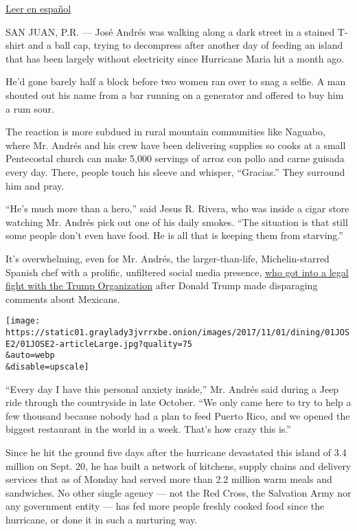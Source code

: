 \href{https://www.nytimes3xbfgragh.onion/es/2017/11/03/los-chefs-que-cambian-como-se-entrega-la-ayuda-posdesastre/}{Leer
en español}

SAN JUAN, P.R. --- José Andrés was walking along a dark street in a
stained T-shirt and a ball cap, trying to decompress after another day
of feeding an island that has been largely without electricity since
Hurricane Maria hit a month ago.

He'd gone barely half a block before two women ran over to snag a
selfie. A man shouted out his name from a bar running on a generator and
offered to buy him a rum sour.

The reaction is more subdued in rural mountain communities like Naguabo,
where Mr. Andrés and his crew have been delivering supplies so cooks at
a small Pentecostal church can make 5,000 servings of arroz con pollo
and carne guisada every day. There, people touch his sleeve and whisper,
``Gracias.'' They surround him and pray.

``He's much more than a hero,'' said Jesus R. Rivera, who was inside a
cigar store watching Mr. Andrés pick out one of his daily smokes. ``The
situation is that still some people don't even have food. He is all that
is keeping them from starving.''

It's overwhelming, even for Mr. Andrés, the larger-than-life,
Michelin-starred Spanish chef with a prolific, unfiltered social media
presence,
\href{http://www.npr.org/sections/thetwo-way/2017/04/07/523004201/trump-organization-settles-lawsuit-with-chef-jos-andr-s}{who
got into a legal fight with the Trump Organization} after Donald Trump
made disparaging comments about Mexicans.

\texttt{[image: https://static01.graylady3jvrrxbe.onion/images/2017/11/01/dining/01JOSE2/01JOSE2-articleLarge.jpg?quality=75\\\&auto=webp\\\&disable=upscale]}

``Every day I have this personal anxiety inside,'' Mr. Andrés said
during a Jeep ride through the countryside in late October. ``We only
came here to try to help a few thousand because nobody had a plan to
feed Puerto Rico, and we opened the biggest restaurant in the world in a
week. That's how crazy this is.''

Since he hit the ground five days after the hurricane devastated this
island of 3.4 million on Sept. 20, he has built a network of kitchens,
supply chains and delivery services that as of Monday had served more
than 2.2 million warm meals and sandwiches. No other single agency ---
not the Red Cross, the Salvation Army nor any government entity --- has
fed more people freshly cooked food since the hurricane, or done it in
such a nurturing way.

